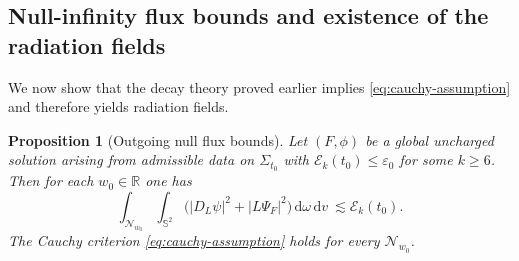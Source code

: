 \documentclass[11pt]{article}
\numberwithin{equation}{section}
\theoremstyle{plain}
\newtheorem{proposition}[theorem]{Proposition}
\theoremstyle{definition}
\theoremstyle{remark}
\newcommand{\dd}{\mathrm{d}}
\begin{document}
\subsection{Null-infinity flux bounds and existence of the radiation fields}
\label{subsec:rp-proved}

We now show that the decay theory proved earlier implies \eqref{eq:cauchy-assumption} and therefore yields radiation fields.

\begin{proposition}[Outgoing null flux bounds]\label{prop:p2-flux-proved}
Let $(F,\phi)$ be a global uncharged solution arising from admissible data on $\Sigma_{t_0}$ with $\mathcal{E}_k(t_0)\le \varepsilon_0$ for some $k\ge 6$.
Then for each $w_0\in\mathbb{R}$ one has
\begin{equation}\label{eq:p2-flux}
\int_{\mathcal{N}_{w_0}}\!\!\int_{\mathbb{S}^2}
\bigl(|D_L\psi|^2 + |L\Psi_F|^2\bigr)\,\dd\omega\,\dd v
\ \lesssim
\mathcal{E}_k(t_0).
\end{equation}
The Cauchy criterion \eqref{eq:cauchy-assumption} holds for every $\mathcal{N}_{w_0}$.
\end{proposition}
\end{document}
